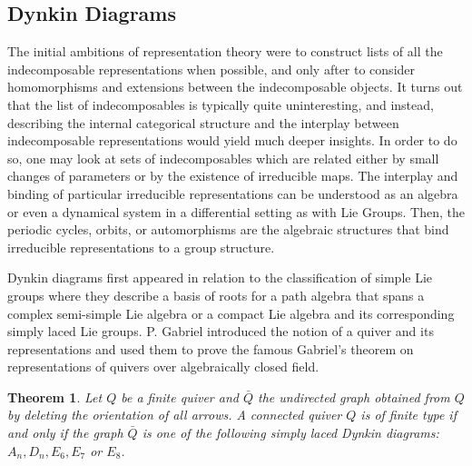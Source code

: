 \documentclass{article}
\newtheorem{theorem}{Theorem}[section]
\theoremstyle{definition}
\begin{document}
\subsection{Dynkin Diagrams}
\label{sec:dynkin-diagrams}
The initial ambitions of representation theory were to construct lists of all the indecomposable representations when possible, and only after to consider homomorphisms and extensions between the indecomposable objects. 
It turns out that the list of indecomposables is typically quite uninteresting, and instead, describing the internal categorical structure and the interplay between indecomposable representations would yield much deeper insights. In order to do so, one may look at sets of indecomposables which are related either by small changes of parameters or by the existence of irreducible maps. 
The interplay and binding of particular irreducible representations can be understood as an algebra or even a dynamical system in a differential setting as with Lie Groups. Then, the periodic cycles, orbits, or automorphisms are the algebraic structures that bind irreducible representations to a group structure.

Dynkin diagrams first appeared in relation to the classification of simple Lie groups where they describe a basis of roots for a path algebra that spans a complex semi-simple Lie algebra or a compact Lie algebra and its corresponding simply laced Lie groups. P. Gabriel introduced the notion of a quiver and its representations and used them to prove the famous Gabriel’s theorem on representations of quivers over algebraically closed field. 

\begin{theorem}
Let $Q$ be a finite quiver and $\bar{Q}$ the undirected graph obtained from $Q$ by deleting the orientation of all arrows. A connected quiver $Q$ is of finite type if and only if the graph $\bar{Q}$ is one of the following simply laced Dynkin diagrams: $A_n, D_n, E_6, E_7$ or $E_8$.
\end{theorem}



\end{document}
